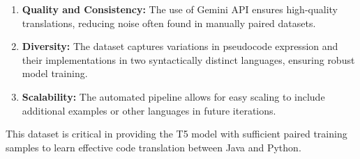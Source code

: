\documentclass{dhbenelux}
\begin{document}
\begin{enumerate}
  \item \textbf{Quality and Consistency:} The use of Gemini API ensures high-quality translations, reducing noise often found in manually paired datasets.
  \item \textbf{Diversity:} The dataset captures variations in pseudocode expression and their implementations in two syntactically distinct languages, ensuring robust model training.
  \item \textbf{Scalability:} The automated pipeline allows for easy scaling to include additional examples or other languages in future iterations.
\end{enumerate}

This dataset is critical in providing the T5 model with sufficient paired training samples to learn effective code translation between Java and Python.

%
%
%
%
%
\end{document}
